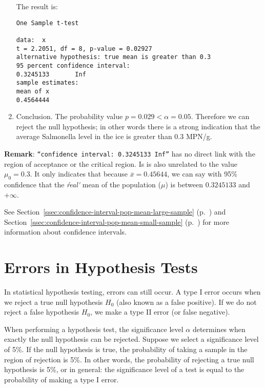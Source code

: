 \begin{example}
\begin{enumerate}
    The result is:
    
\begin{verbatim}
One Sample t-test

data:  x
t = 2.2051, df = 8, p-value = 0.02927
alternative hypothesis: true mean is greater than 0.3
95 percent confidence interval:
0.3245133       Inf
sample estimates:
mean of x 
0.4564444 
\end{verbatim}
    \item Conclusion. The probability value $p = 0.029 < \alpha = 0.05$. Therefore we can reject the null hypothesis; in other words there is a strong indication that the average Salmonella level in the ice is greater than 0.3 MPN/g.
  \end{enumerate}
\textbf{Remark}: \texttt{``confidence interval: 0.3245133 Inf''} has no direct link with the region of acceptance or the critical region.
Is is also unrelated to the value $\mu_{0}=0.3$. 
It only indicates that because $\overline{x}=0.45644$,
we can say with 95\% confidence that the \textit{\'real\'} mean of the population ($\mu$) is between $0.3245133$ and $+\infty$.


See Section~\ref{ssec:confidence-interval-pop-mean-large-sample} (p.~\pageref{ssec:confidence-interval-pop-mean-large-sample}) and Section~\ref{ssec:confidence-interval-pop-mean-small-sample} (p.~\pageref{ssec:confidence-interval-pop-mean-small-sample}) for more information about confidence intervals.
\end{example}


\section{Errors in Hypothesis Tests}

In statistical hypothesis testing, errors can still occur. A type I error occurs when we reject a true null hypothesis $H_{0}$ (also known as a false positive). If we do not reject a false hypothesis $H_{0}$, we make a type II error (or false negative).

When performing a hypothesis test, the significance level $\alpha$ determines when exactly the null hypothesis can be rejected. Suppose we select a significance level of 5\%.
If the null hypothesis is true, the probability of taking a sample in the region of rejection is 5\%. 
In other words, the probability of rejecting a true null hypothesis is 5\%, or in general: the significance level of a test is equal to the probability of making a type I error.

